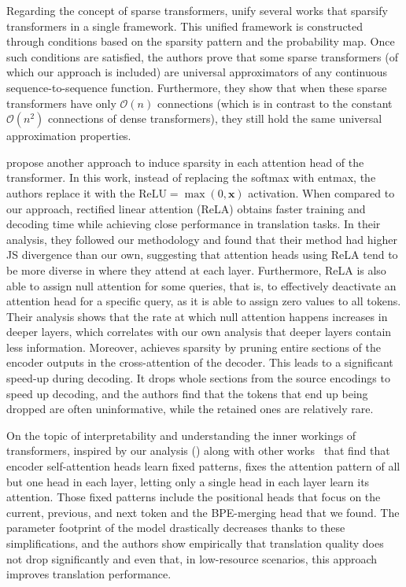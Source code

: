 Regarding the concept of sparse transformers,
\citet{yun2020ConnectionsareExpressive} unify several works that
sparsify transformers in a single framework.
This unified framework is constructed through conditions based on the
sparsity pattern and the probability map. Once such conditions are
satisfied, the authors prove that some sparse transformers (of which
our approach is included) are universal approximators of any
continuous sequence-to-sequence function. Furthermore, they show that
when these sparse transformers have only $\mathcal{O}(n)$ connections (which is
in contrast to the constant $\mathcal{O}(n^2)$ connections of dense
transformers), they still hold the same universal approximation
properties.

\citet{zhang2021SparseAttentionLinear} propose another approach to
induce sparsity in each attention head of the transformer. In this
work, instead of replacing the softmax with entmax, the authors
replace it with the $\text{ReLU}=\max(0, \bm{x})$ activation. When compared to our approach,
rectified linear attention (ReLA) obtains faster training and
decoding time while achieving close performance in translation
tasks. In their analysis, they followed our methodology and found
that their method had higher JS divergence than our own, suggesting
that attention heads using ReLA tend to be more diverse in where they
attend at each layer. Furthermore, ReLA is also able to assign null
attention for some queries, that is, to effectively deactivate an
attention head for a specific query, as it is able to assign zero
values to all tokens. Their analysis shows that the rate at which
null attention happens increases in deeper layers, which correlates
with our own analysis that deeper layers contain less information.
Moreover, \citet{zhang2021SparsifyingEncoderOutputs} achieves
sparsity by pruning entire sections of the encoder outputs in the
cross-attention of the decoder. This leads to a significant speed-up
during decoding. It drops whole sections from the source encodings to
speed up decoding, and the authors find that the tokens that end up
being dropped are often uninformative, while the retained ones
are relatively rare.

On the topic of interpretability and understanding the inner workings
of transformers, inspired by our analysis () along with other
works~\citep[\eg, ][]{specialized} that find that
encoder self-attention heads learn fixed patterns, \citet{raganato2020FixedEncoderSelfAttention}
fixes the attention pattern of all but one head in each layer,
letting only a single head in each layer learn its attention. Those
fixed patterns include the positional heads that focus on the
current, previous, and next token and the BPE-merging head that we
found. The parameter footprint of the model drastically decreases
thanks to these simplifications, and the authors show empirically
that translation quality does not drop significantly and even that,
in low-resource scenarios, this approach improves translation
performance.

